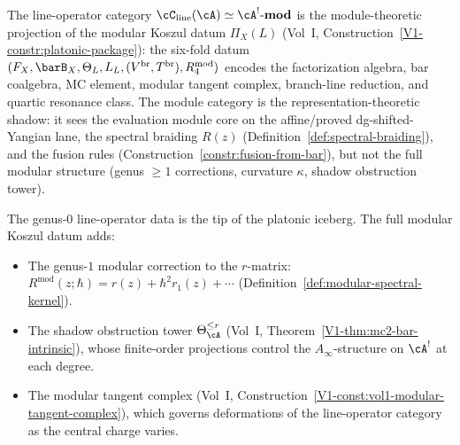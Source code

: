 \begin{remark}
The line-operator category $\cC_{\mathrm{line}}(\cA)
\simeq\cA^!\text{-}\mathbf{mod}$ is the module-theoretic
projection of the modular Koszul datum $\Pi_X(L)$
(Vol~I, Construction~\ref*{V1-constr:platonic-package}):
the six-fold datum
$(F_X,\barB_X,\Theta_L,L_L,(V^{\mathrm{br}},T^{\mathrm{br}}),R_4^{\mathrm{mod}})$
encodes the factorization algebra, bar coalgebra, MC element,
modular tangent complex, branch-line reduction, and quartic
resonance class. The module category is the
representation-theoretic shadow: it sees the evaluation
module core on the affine/proved dg-shifted-Yangian lane,
the spectral braiding $R(z)$
(Definition~\ref{def:spectral-braiding}), and the
fusion rules (Construction~\ref{constr:fusion-from-bar}),
but not the full modular structure (genus $\ge 1$
corrections, curvature $\kappa$, shadow obstruction tower).

The genus-$0$ line-operator data is the tip of the
platonic iceberg. The full modular Koszul datum adds:
\begin{itemize}
\item The genus-$1$ modular correction to the $r$-matrix:
 $R^{\mathrm{mod}}(z;\hbar)=r(z)+\hbar^2 r_1(z)+\cdots$
 (Definition~\ref{def:modular-spectral-kernel}).
\item The shadow obstruction tower
 $\Theta_\cA^{\le r}$ (Vol~I, Theorem~\ref*{V1-thm:mc2-bar-intrinsic}),
 whose finite-order projections control the $A_\infty$-structure
 on $\cA^!$ at each degree.
\item The modular tangent complex
 (Vol~I, Construction~\ref*{V1-const:vol1-modular-tangent-complex}),
 which governs deformations of the line-operator category
 as the central charge varies.
\end{itemize}
\end{remark}

